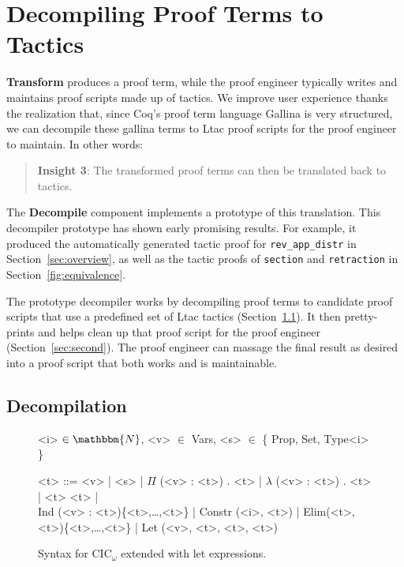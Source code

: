 \section{Decompiling Proof Terms to Tactics}
\label{sec:decompiler}

\textbf{Transform} produces a proof term,
while the proof engineer typically writes and maintains proof scripts made up of tactics.
We improve user experience thanks the realization that, since Coq's proof term language Gallina is very structured,
we can decompile these gallina terms to Ltac proof scripts for the proof engineer to maintain. In other words:

\begin{quote}
\textbf{Insight 3}: The transformed proof terms can then be translated back to tactics.
\end{quote}

The \textbf{Decompile} component implements a prototype of this translation.
This decompiler prototype has shown early promising results.
For example, it produced the automatically generated tactic proof for \lstinline{rev_app_distr} 
in Section~\ref{sec:overview}, as well as the tactic proofs of \lstinline{section}
and \lstinline{retraction} in Section~\ref{fig:equivalence}.

The prototype decompiler works by decompiling proof terms to candidate proof scripts that 
use a predefined set of Ltac tactics (Section~\ref{sec:first}).
It then pretty-prints and helps clean up that proof script for the proof engineer (Section~\ref{sec:second}).
The proof engineer can massage the final result as desired into a proof script that both works and is maintainable.

\subsection{Decompilation}
\label{sec:first}

\begin{figure}
\small
\begin{grammar}
<i> $\in \mathbbm{N}$, <v> $\in$ Vars, <s> $\in$ \{ Prop, Set, Type<i> \}

<t> ::= <v> | <s> | $\Pi$ (<v> : <t>) . <t> | $\lambda$ (<v> : <t>) . <t> | <t> <t> | \\
Ind (<v> : <t>)\{<t>,\ldots,<t>\} | Constr (<i>, <t>) | Elim(<t>, <t>)\{<t>,\ldots,<t>\} | Let (<v>, <t>, <t>, <t>)
\end{grammar}
\caption{Syntax for CIC$_{\omega}$ extended with let expressions.}
\label{fig:gallinasyntax}
\end{figure}


